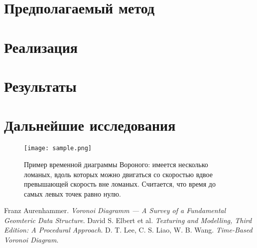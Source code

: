 \documentclass[12pt]{article}
\begin{document}
\section{Предполагаемый метод}
\section{Реализация}
\section{Результаты}
\section{Дальнейшие исследования}

\begin{figure}
\center\texttt{[image: sample.png]}
\caption{Пример временной диаграммы Вороного: имеется несколько ломаных, вдоль которых можно двигаться со скоростью вдвое превышающей скорость вне ломаных. Считается, что время до самых левых точек равно нулю.}
\label{task_fig}
\end{figure}

\pagebreak

\begin{thebibliography}{10}
 Franz Aurenhammer. \textit{Voronoi Diagramm --- A Survey of a Fundamental Geomteric Data Structure}.
 David S. Elbert et al. \textit{Texturing and Modelling, Third Edition: A Procedural Approach}.
 D. T. Lee, C. S. Liao, W. B. Wang. \textit{Time-Based Voronoi Diagram}.
\end{thebibliography}
\end{document}
